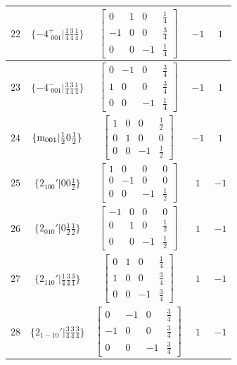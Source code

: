 \documentclass[fleqn,8pt]{jsarticle}
\begin{document}
\begin{longtable}{ccccc}
$ 22 $ & $ \{-4^{+}_{\,\,001}|\frac{1}{4} \frac{3}{4} \frac{1}{4}\} $ & $ \begin{bmatrix} 0 & 1 & 0 & \frac{1}{4} \\ -1 & 0 & 0 & \frac{3}{4} \\ 0 & 0 & -1 & \frac{1}{4} \end{bmatrix} $ & $ -1 $ & $ 1 $ \\ \hline
$ 23 $ & $ \{-4^{-}_{\,\,001}|\frac{3}{4} \frac{3}{4} \frac{1}{4}\} $ & $ \begin{bmatrix} 0 & -1 & 0 & \frac{3}{4} \\ 1 & 0 & 0 & \frac{3}{4} \\ 0 & 0 & -1 & \frac{1}{4} \end{bmatrix} $ & $ -1 $ & $ 1 $ \\ \hline
$ 24 $ & $ \{{\rm m}_{001}|\frac{1}{2} 0 \frac{1}{2}\} $ & $ \begin{bmatrix} 1 & 0 & 0 & \frac{1}{2} \\ 0 & 1 & 0 & 0 \\ 0 & 0 & -1 & \frac{1}{2} \end{bmatrix} $ & $ -1 $ & $ 1 $ \\ \hline
$ 25 $ & $ \{2{}_{100}{}'|0 0 \frac{1}{2}\} $ & $ \begin{bmatrix} 1 & 0 & 0 & 0 \\ 0 & -1 & 0 & 0 \\ 0 & 0 & -1 & \frac{1}{2} \end{bmatrix} $ & $ 1 $ & $ -1 $ \\ \hline
$ 26 $ & $ \{2{}_{010}{}'|0 \frac{1}{2} \frac{1}{2}\} $ & $ \begin{bmatrix} -1 & 0 & 0 & 0 \\ 0 & 1 & 0 & \frac{1}{2} \\ 0 & 0 & -1 & \frac{1}{2} \end{bmatrix} $ & $ 1 $ & $ -1 $ \\ \hline
$ 27 $ & $ \{2{}_{110}{}'|\frac{1}{4} \frac{3}{4} \frac{3}{4}\} $ & $ \begin{bmatrix} 0 & 1 & 0 & \frac{1}{4} \\ 1 & 0 & 0 & \frac{3}{4} \\ 0 & 0 & -1 & \frac{3}{4} \end{bmatrix} $ & $ 1 $ & $ -1 $ \\ \hline
$ 28 $ & $ \{2{}_{1-10}{}'|\frac{3}{4} \frac{3}{4} \frac{3}{4}\} $ & $ \begin{bmatrix} 0 & -1 & 0 & \frac{3}{4} \\ -1 & 0 & 0 & \frac{3}{4} \\ 0 & 0 & -1 & \frac{3}{4} \end{bmatrix} $ & $ 1 $ & $ -1 $ \\ \hline

\end{longtable}
\end{document}
